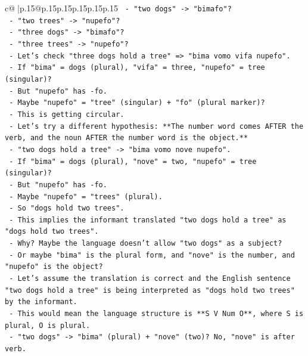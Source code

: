 \documentclass{article}
\begin{document}
{\begin{supertabular}{c@{$\;$}|p{.15\linewidth}@{}p{.15\linewidth}p{.15\linewidth}p{.15\linewidth}p{.15\linewidth}p{.15\linewidth}}
{{{\texttt{             {-} "two dogs" {-}> "bimafo"?} \\
\texttt{             {-} "two trees" {-}> "nupefo"?} \\
\texttt{             {-} "three dogs" {-}> "bimafo"?} \\
\texttt{             {-} "three trees" {-}> "nupefo"?} \\
\texttt{             {-} Let's check "three dogs hold a tree" => "bima vomo vifa nupefo".} \\
\texttt{             {-} If "bima" = dogs (plural), "vifa" = three, "nupefo" = tree (singular)?} \\
\texttt{             {-} But "nupefo" has {-}fo.} \\
\texttt{             {-} Maybe "nupefo" = "tree" (singular) + "fo" (plural marker)?} \\
\texttt{             {-} This is getting circular.} \\
\texttt{             {-} Let's try a different hypothesis: **The number word comes AFTER the verb, and the noun AFTER the number word is the object.**} \\
\texttt{             {-} "two dogs hold a tree" {-}> "bima vomo nove nupefo".} \\
\texttt{             {-} If "bima" = dogs (plural), "nove" = two, "nupefo" = tree (singular)?} \\
\texttt{             {-} But "nupefo" has {-}fo.} \\
\texttt{             {-} Maybe "nupefo" = "trees" (plural).} \\
\texttt{             {-} So "dogs hold two trees".} \\
\texttt{             {-} This implies the informant translated "two dogs hold a tree" as "dogs hold two trees".} \\
\texttt{             {-} Why? Maybe the language doesn't allow "two dogs" as a subject?} \\
\texttt{             {-} Or maybe "bima" is the plural form, and "nove" is the number, and "nupefo" is the object?} \\
\texttt{             {-} Let's assume the translation is correct and the English sentence "two dogs hold a tree" is being interpreted as "dogs hold two trees" by the informant.} \\
\texttt{             {-} This would mean the language structure is **S V Num O**, where S is plural, O is plural.} \\
\texttt{             {-} "two dogs" {-}> "bima" (plural) + "nove" (two)? No, "nove" is after verb.} \\
}}}
\end{supertabular}}
\end{document}
